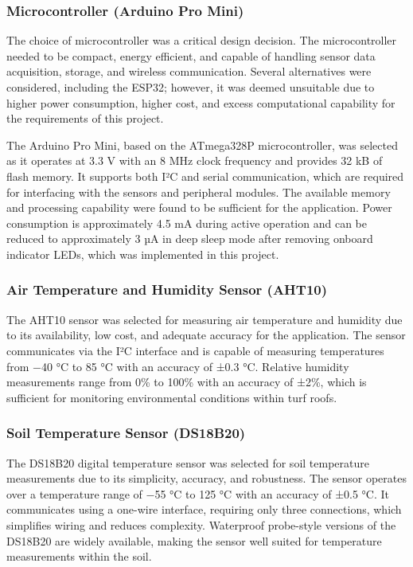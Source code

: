 \subsubsection{Microcontroller (Arduino Pro
Mini)}

The choice of microcontroller was a critical design decision.
The microcontroller needed to be compact, energy efficient, and capable
of handling sensor data acquisition, storage, and wireless
communication. Several alternatives were considered, including the
ESP32; however, it was deemed unsuitable due to higher power
consumption, higher cost, and excess computational capability for the
requirements of this
project.


The Arduino Pro Mini, based on the ATmega328P
microcontroller, was selected as it operates at 3.3 V with an 8 MHz
clock frequency and provides 32 kB of flash memory. It supports both I²C
and serial communication, which are required for interfacing with the
sensors and peripheral modules. The available memory and processing
capability were found to be sufficient for the application. Power
consumption is approximately 4.5 mA during active operation and can be
reduced to approximately 3 µA in deep sleep mode after removing onboard
indicator LEDs, which was implemented in this
project.


\subsubsection{Air Temperature and Humidity Sensor
(AHT10)}

The AHT10 sensor was selected for measuring air temperature
and humidity due to its availability, low cost, and adequate accuracy
for the application. The sensor communicates via the I²C interface and
is capable of measuring temperatures from −40 °C to 85 °C with an
accuracy of ±0.3 °C. Relative humidity measurements range from 0\% to
100\% with an accuracy of ±2\%, which is sufficient for monitoring
environmental conditions within turf
roofs.


\subsubsection{Soil Temperature Sensor
(DS18B20)}

The DS18B20 digital temperature sensor was selected for soil
temperature measurements due to its simplicity, accuracy, and
robustness. The sensor operates over a temperature range of −55 °C to
125 °C with an accuracy of ±0.5 °C. It communicates using a one-wire
interface, requiring only three connections, which simplifies wiring and
reduces complexity. Waterproof probe-style versions of the DS18B20 are
widely available, making the sensor well suited for temperature
measurements within the soil.


